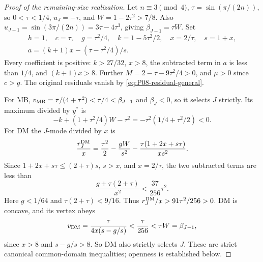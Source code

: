 \begin{proof}[Proof of the remaining-size realization]
Let $n\equiv3\pmod4$, $\tau=\sin(\pi/(2n))$, so $0<\tau<1/4$,
$u_J=-\tau$, and $W=1-2\tau^2>7/8$.
Also $u_{J-1}=\sin(3\pi/(2n))=3\tau-4\tau^3$, giving
$\beta_{J-1}=\tau W$. Set
\begin{equation}
\begin{gathered}
 h=1,\quad c=\tau,\quad g=\tau^2/4,\quad
 k=1-5\tau^2/2,\quad x=2/\tau,\quad s=1+x,\\
 a=(k+1)x-(\tau-\tau^2/4)/s.
\end{gathered}\label{eq:P08-reverse-family}
\end{equation}
Every coefficient is positive: $k>27/32$, $x>8$, the subtracted
term in $a$ is less than $1/4$, and $(k+1)x>8$.
Further $M=2-\tau-9\tau^2/4>0$, and $\mu>0$ since $c>g$.
The original residuals vanish by \eqref{eq:P08-residual-general}.

For MB, $v_{\mathrm{MB}}=\tau/(4+\tau^2)<\tau/4<\beta_{J-1}$ and
$\beta_J<0$, so it selects $J$ strictly. Its maximum divided by $y^*$ is
\[
 -k+(1+\tau^2/4)W-\tau^2=-\tau^2(1/4+\tau^2/2)<0.
\]
For DM the $J$-mode divided by $x$ is
\[
 \frac{r_J^{\mathrm{DM}}}x=\frac{\tau^2}{2}-\frac{gW}{s^2}
              -\frac{\tau(1+2x+s\tau)}{xs^2}.
\]
Since $1+2x+s\tau\le(2+\tau)s$, $s>x$, and $x=2/\tau$,
the two subtracted terms are less than
\[
 \frac{g+\tau(2+\tau)}{x^2}<\frac{37}{256}\tau^2.
\]
Here $g<1/64$ and $\tau(2+\tau)<9/16$. Thus
$r_J^{\mathrm{DM}}/x>91\tau^2/256>0$.
DM is concave, and its vertex obeys
\[
 v_{\mathrm{DM}}=\frac{\tau}{4x(s-g/s)}<\frac{\tau}{256}
      <\tau W=\beta_{J-1},
\]
since $x>8$ and $s-g/s>8$. So DM also strictly selects $J$.
These are strict canonical common-domain inequalities; openness is
established below.
\end{proof}

